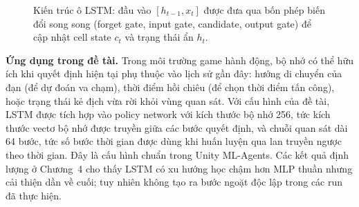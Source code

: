 \begin{figure}[H]
\centering
{}
\caption{Kiến trúc ô LSTM: đầu vào $[h_{t-1},x_t]$ được đưa qua bốn phép biến đổi song song (forget gate, input gate, candidate, output gate) để cập nhật cell state $c_t$ và trạng thái ẩn $h_t$.}
\label{fig:lstm_cell}
\end{figure}

\textbf{Ứng dụng trong đề tài.} Trong môi trường game hành động, bộ nhớ có thể hữu ích khi quyết định hiện tại phụ thuộc vào lịch sử gần đây: hướng di chuyển của đạn (để dự đoán va chạm), thời điểm hồi chiêu (để chọn thời điểm tấn công), hoặc trạng thái kẻ địch vừa rời khỏi vùng quan sát. Với cấu hình của đề tài, LSTM được tích hợp vào policy network với kích thước bộ nhớ 256, tức kích thước vectơ bộ nhớ được truyền giữa các bước quyết định, và chuỗi quan sát dài 64 bước, tức số bước thời gian được dùng khi huấn luyện qua lan truyền ngược theo thời gian. Đây là cấu hình chuẩn trong Unity ML-Agents. Các kết quả định lượng ở Chương~4 cho thấy LSTM có xu hướng học chậm hơn MLP thuần nhưng cải thiện dần về cuối; tuy nhiên không tạo ra bước ngoặt độc lập trong các run đã thực hiện.

